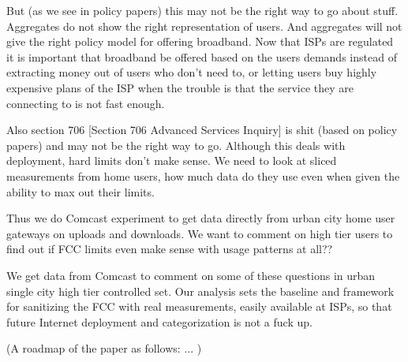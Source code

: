 


But (as we see in policy papers) this may not be the right way to go about stuff. Aggregates do not show the right representation of users. And aggregates will not give the right policy model for offering broadband. Now that ISPs are regulated it is important that broadband be offered based on the users demands instead of extracting money out of users who don't need to, or letting users buy highly expensive plans of the ISP when the trouble is that the service they are connecting to is not fast enough.

Also section 706 [Section 706 Advanced Services Inquiry] is shit (based on policy papers) and may not be the right way to go. Although this deals with deployment, hard limits don't make sense. We need to look at sliced measurements from home users, how much data do they use even when given the ability to max out their limits. 

Thus we do Comcast experiment to get data directly from urban city home user gateways on uploads and downloads. We want to comment on high tier users to find out if FCC limits even make sense with usage patterns at all??

We get data from Comcast to comment on some of these questions in urban single city high tier controlled set. Our analysis sets the baseline and framework for sanitizing the FCC with real measurements, easily available at ISPs, so that future Internet deployment and categorization is not a fuck up.

(A roadmap of the paper as follows: ... )